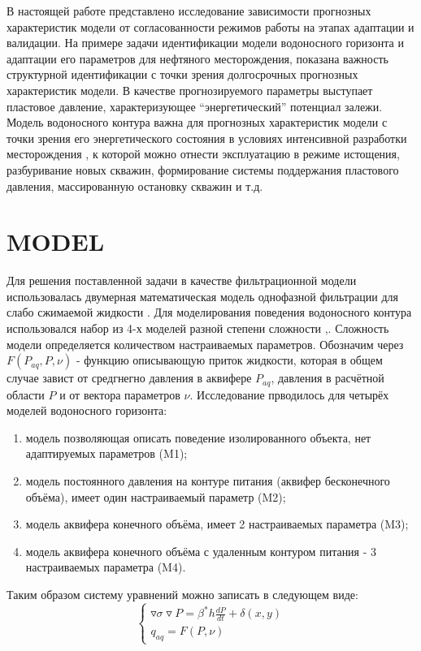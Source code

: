 \documentclass{article}
\begin{document}
	В настоящей работе представлено исследование зависимости прогнозных характеристик модели от согласованности режимов работы на этапах адаптации и валидации. На примере задачи идентификации модели водоносного горизонта и адаптации его параметров для нефтяного месторождения, показана важность структурной идентификации с точки зрения долгосрочных прогнозных характеристик модели. В качестве прогнозируемого параметры выступает пластовое давление, характеризующее “энергетический” потенциал залежи.  Модель водоносного контура важна для прогнозных характеристик модели с точки зрения его энергетического состояния в условиях интенсивной разработки месторождения \cite{kos}, к которой можно отнести эксплуатацию в режиме истощения, разбуривание новых скважин, формирование системы поддержания пластового давления, массированную остановку скважин и т.д. 

\section{MODEL}
Для решения поставленной задачи в качестве фильтрационной модели использовалась двумерная математическая модель однофазной фильтрации для слабо сжимаемой жидкости \cite{bas}. Для моделирования поведения водоносного контура использовался набор из 4-х моделей разной степени сложности \cite{dake},\cite{fet}. Сложность модели определяется количеством настраиваемых параметров. Обозначим через $F(P_{aq}, P,\nu)$ - функцию описывающую приток жидкости, которая в общем случае завист от средгнегно давления в аквифере $P_{aq}$, давления в расчётной области $P$ и от вектора параметров $\nu$. Исследование прводилось для четырёх моделей водоносного горизонта:
\begin{enumerate}
\item модель позволяющая описать поведение изолированного объекта, нет адаптируемых параметров (M1);
\item модель постоянного давления на контуре питания (аквифер бесконечного объёма), имеет один настраиваемый параметр (M2);
\item модель аквифера конечного объёма, имеет 2 настраиваемых параметра (M3); 
\item модель аквифера конечного объёма с удаленным контуром питания - 3 настраиваемых параметра (M4).
\end{enumerate}
Таким образом систему уравнений можно записать в следующем виде:
\begin{equation} \label{fil}
\left\{\begin{array}{crl}
\triangledown\sigma\triangledown P = \beta^*h\frac{dP}{dt}+\delta(x,y)\\
q_{aq} = F(P,\nu)
\end{array}\right.
\end{equation}
\end{document}

